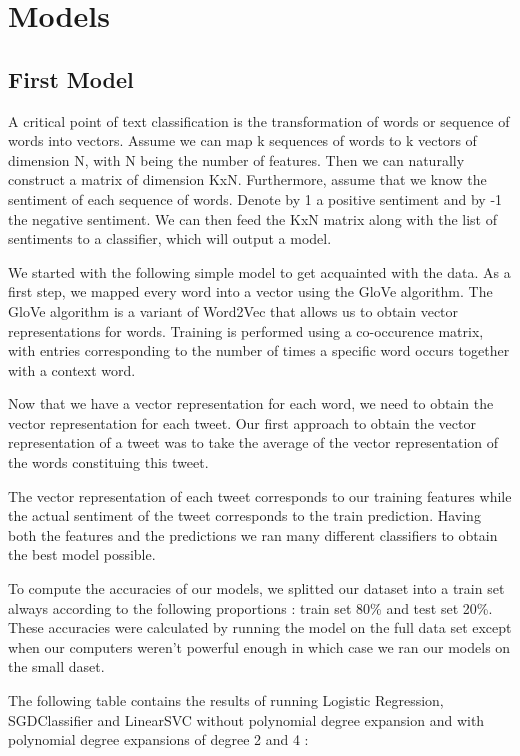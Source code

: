 \documentclass[10pt,conference,compsocconf]{IEEEtran}
\begin{document}
\section{Models}

\subsection{First Model}

A critical point of text classification is the transformation of words or sequence of words into vectors.
Assume we can map k sequences of words to k vectors of dimension N, with N being the number of features. Then we can naturally construct a matrix of dimension KxN.
Furthermore, assume that we know the sentiment of each sequence of words. Denote by 1 a positive sentiment and by -1 the negative sentiment.
We can then feed the KxN matrix along with the list of sentiments to a classifier, which will output a model.

We started with the following simple model to get acquainted with the data. As a first step, we mapped every word into a vector using the GloVe algorithm. The GloVe algorithm is a variant of Word2Vec that allows us to obtain vector representations for words. Training is performed using a co-occurence matrix, with entries corresponding to the number of times a specific word occurs together with a context word.

Now that we have a vector representation for each word, we need to obtain the vector representation for each tweet.
Our first approach to obtain the vector representation of a tweet was to take the average of the vector representation of the words constituing this tweet.

The vector representation of each tweet corresponds to our training features while the actual sentiment of the tweet corresponds to the train prediction.
Having both the features and the predictions we ran many different classifiers to obtain the best model possible.

To compute the accuracies of our models, we splitted our dataset into a train set always according to the following proportions : train set 80\% and test set 20\%. These accuracies were calculated by running the model on the full data set except when our computers weren't powerful enough in which case we ran our models on the small daset.

The following table contains the results of running Logistic Regression, SGDClassifier and LinearSVC without polynomial degree expansion and with polynomial degree expansions of degree 2 and 4 :
\end{document}
